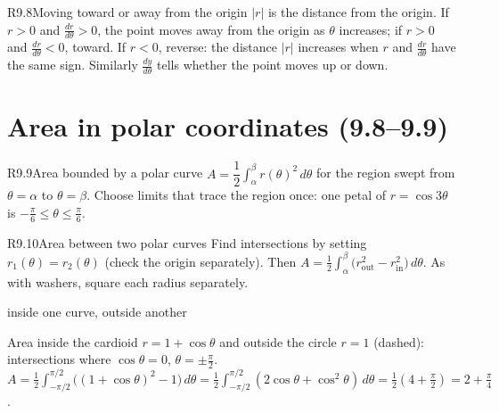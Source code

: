\documentclass{apcalc}
\begin{document}
\begin{rulebox}{R9.8}{Moving toward or away from the origin}
$|r|$ is the distance from the origin. If $r>0$ and $\frac{dr}{d\theta}>0$, the point moves away from the origin as $\theta$ increases; if $r>0$ and $\frac{dr}{d\theta}<0$, toward. If $r<0$, reverse: the distance $|r|$ increases when $r$ and $\frac{dr}{d\theta}$ have the same sign. Similarly $\frac{dy}{d\theta}$ tells whether the point moves up or down.
\end{rulebox}

\section{Area in polar coordinates (9.8--9.9)}

\begin{rulebox}{R9.9}{Area bounded by a polar curve}
$A=\dfrac12\displaystyle\int_\alpha^\beta r(\theta)^2\,d\theta$ for the region swept from $\theta=\alpha$ to $\theta=\beta$. Choose limits that trace the region once: one petal of $r=\cos3\theta$ is $-\frac\pi6\le\theta\le\frac\pi6$.
\end{rulebox}

\begin{rulebox}{R9.10}{Area between two polar curves}
Find intersections by setting $r_1(\theta)=r_2(\theta)$ (check the origin separately). Then $A=\frac12\int_\alpha^\beta\big(r_{\text{out}}^2-r_{\text{in}}^2\big)\,d\theta$. As with washers, square each radius separately.
\end{rulebox}

\begin{example}{inside one curve, outside another}
\begin{center}
\end{center}
Area inside the cardioid $r=1+\cos\theta$ and outside the circle $r=1$ (dashed): intersections where $\cos\theta=0$, $\theta=\pm\frac\pi2$.
$A=\frac12\int_{-\pi/2}^{\pi/2}\big((1+\cos\theta)^2-1\big)\,d\theta=\frac12\int_{-\pi/2}^{\pi/2}(2\cos\theta+\cos^2\theta)\,d\theta=\frac12\left(4+\frac\pi2\right)=2+\frac\pi4$. 
\end{example}
\end{document}
